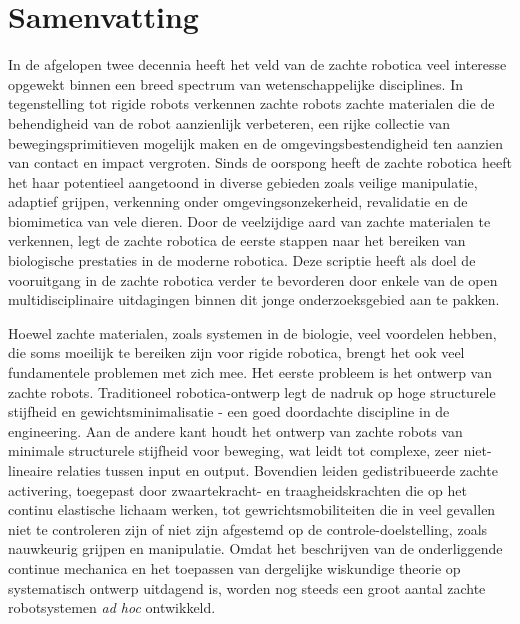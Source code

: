 \chapter*{Samenvatting}
\vspace{-10mm}
In de afgelopen twee decennia heeft het veld van de zachte robotica veel interesse opgewekt binnen een breed spectrum van wetenschappelijke disciplines. In tegenstelling tot rigide robots verkennen zachte robots zachte materialen die de behendigheid van de robot aanzienlijk verbeteren, een rijke collectie van bewegingsprimitieven mogelijk maken en de omgevingsbestendigheid ten aanzien van contact en impact vergroten. Sinds de oorspong heeft de zachte robotica heeft het haar potentieel aangetoond in diverse gebieden zoals veilige manipulatie, adaptief grijpen, verkenning onder omgevingsonzekerheid, revalidatie en de biomimetica van vele dieren. Door de veelzijdige aard van zachte materialen te verkennen, legt de zachte robotica de eerste stappen naar het bereiken van biologische prestaties in de moderne robotica. Deze scriptie heeft als doel de vooruitgang in de zachte robotica verder te bevorderen door enkele van de open multidisciplinaire uitdagingen binnen dit jonge onderzoeksgebied aan te pakken.

Hoewel zachte materialen, zoals systemen in de biologie, veel voordelen hebben, die soms moeilijk te bereiken zijn voor rigide robotica, brengt het ook veel fundamentele problemen met zich mee. Het eerste probleem is het ontwerp van zachte robots. Traditioneel robotica-ontwerp legt de nadruk op hoge structurele stijfheid en gewichtsminimalisatie - een goed doordachte discipline in de engineering. Aan de andere kant houdt het ontwerp van zachte robots van minimale structurele stijfheid voor beweging, wat leidt tot complexe, zeer niet-lineaire relaties tussen input en output. Bovendien leiden gedistribueerde zachte activering, toegepast door zwaartekracht- en traagheidskrachten die op het continu elastische lichaam werken, tot gewrichtsmobiliteiten die in veel gevallen niet te controleren zijn of niet zijn afgestemd op de controle-doelstelling, zoals nauwkeurig grijpen en manipulatie. Omdat het beschrijven van de onderliggende continue mechanica en het toepassen van dergelijke wiskundige theorie op systematisch ontwerp uitdagend is, worden nog steeds een groot aantal zachte robotsystemen \textit{ad hoc} ontwikkeld.

